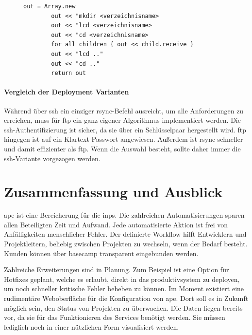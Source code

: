 \begin{figure}
	\begin{lstlisting}[caption=Verarbeitung eines Verzeichnisses,label={lst:process_dir}]
		out = Array.new
		out << "mkdir <verzeichnisname>
		out << "lcd <verzeichnisname>
		out << "cd <verzeichnisname>
		for all children { out << child.receive }
		out << "lcd .."
		out << "cd .."
		return out
	\end{lstlisting}
\end{figure}


\paragraph{Vergleich der Deployment Varianten} %
\label{ssub:vergleich_der_deployment_varianten}

Während über \gls{ssh} ein einziger rsync-Befehl ausreicht, um alle Anforderungen zu erreichen, muss für \gls{ftp} ein ganz eigener Algorithmus implementiert werden. Die \gls{ssh}-Authentifizierung ist sicher, da sie über ein Schlüsselpaar hergestellt wird. \gls{ftp} hingegen ist auf ein Klartext-Passwort angewiesen. Außerdem ist rsync schneller und damit effizienter als \gls{ftp}. Wenn die Auswahl besteht, sollte daher immer die \gls{ssh}-Variante vorgezogen werden.





\section{Zusammenfassung und Ausblick} %
\label{sec:zusammenfassung_und_ausblick}

\gls{ape} ist eine Bereicherung für die \gls{inps}. Die zahlreichen Automatisierungen sparen allen Beteiligten Zeit und Aufwand. Jede automatisierte Aktion ist frei von Anfälligkeiten menschlicher Fehler. Der definierte Workflow hilft Entwicklern und Projektleitern, beliebig zwischen Projekten zu wechseln, wenn der Bedarf besteht. Kunden können über \gls{basecamp} transparent eingebunden werden.

Zahlreiche Erweiterungen sind in Planung. Zum Beispiel ist eine Option für Hotfixes geplant, welche es erlaubt, direkt in das \gls{produktivsystem} zu deployen, um noch schneller kritische Fehler beheben zu können. Im Moment existiert eine rudimentäre Weboberfläche für die Konfiguration von \gls{ape}. Dort soll es in Zukunft möglich sein, den Status von Projekten zu überwachen. Die Daten liegen bereits vor, da sie für das Funktionieren des Services benötigt werden. Sie müssen lediglich noch in einer nützlichen Form visualisiert werden.

